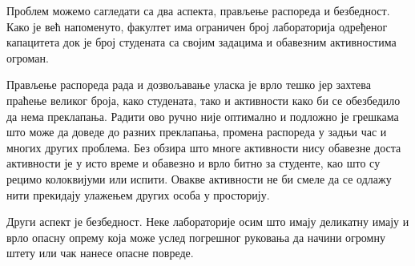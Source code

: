 \documentclass[12pt]{article}
\begin{document}
	\begin{justify}
		
		Проблем можемо сагледати са два аспекта, прављење распореда и безбедност. Како је већ напоменуто, факултет има ограничен број лабораторија одређеног капацитета док је број студената са својим задацима и обавезним активностима огроман.
		
		Прављење распореда рада и дозвољавање уласка је врло тешко јер захтева праћење великог броја, како студената, тако и активности како би се обезбедило да нема преклапања. Радити ово ручно није оптимално и подложно је грешкама што може да доведе до разних преклапања, промена распореда у задњи час и многих других проблема. Без обзира што многе активности нису обавезне доста активности је у исто време и обавезно и врло битно за студенте, као што су рецимо колоквијуми или испити. Овакве активности не би смеле да се одлажу нити прекидају улажењем других особа у просторију.
		
		Други аспект је безбедност. Неке лабораторије осим што имају деликатну имају и врло опасну опрему која може услед погрешног руковања да начини огромну штету или чак нанесе опасне повреде.
	\end{justify}
	
	
\end{document}
